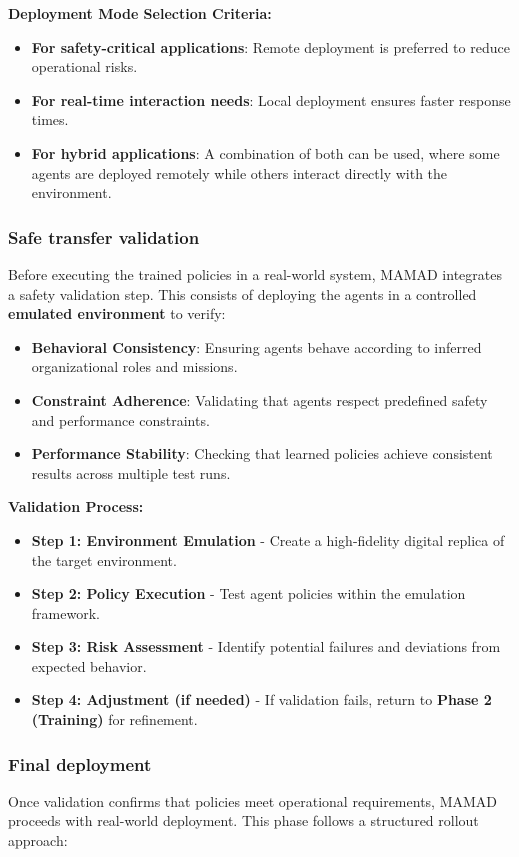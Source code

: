 \documentclass[pdflatex,sn-mathphys-num]{sn-jnl}%
\theoremstyle{thmstyleone}%
\theoremstyle{thmstyletwo}%
\theoremstyle{thmstylethree}%
\begin{document}
\noindent \textbf{Deployment Mode Selection Criteria:}
\begin{itemize}
    \item \textbf{For safety-critical applications}: Remote deployment is preferred to reduce operational risks.
    \item \textbf{For real-time interaction needs}: Local deployment ensures faster response times.
    \item \textbf{For hybrid applications}: A combination of both can be used, where some agents are deployed remotely while others interact directly with the environment.
\end{itemize}

\subsubsection{Safe transfer validation}
Before executing the trained policies in a real-world system, MAMAD integrates a safety validation step. This consists of deploying the agents in a controlled \textbf{emulated environment} to verify:
\begin{itemize}
    \item \textbf{Behavioral Consistency}: Ensuring agents behave according to inferred organizational roles and missions.
    \item \textbf{Constraint Adherence}: Validating that agents respect predefined safety and performance constraints.
    \item \textbf{Performance Stability}: Checking that learned policies achieve consistent results across multiple test runs.
\end{itemize}

\noindent \textbf{Validation Process:}
\begin{itemize}
    \item \textbf{Step 1: Environment Emulation} - Create a high-fidelity digital replica of the target environment.
    \item \textbf{Step 2: Policy Execution} - Test agent policies within the emulation framework.
    \item \textbf{Step 3: Risk Assessment} - Identify potential failures and deviations from expected behavior.
    \item \textbf{Step 4: Adjustment (if needed)} - If validation fails, return to \textbf{Phase 2 (Training)} for refinement.
\end{itemize}

\subsubsection{Final deployment}
Once validation confirms that policies meet operational requirements, MAMAD proceeds with real-world deployment. This phase follows a structured rollout approach:
\end{document}
